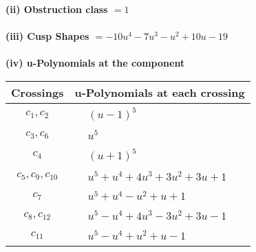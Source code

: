 \documentclass[1p]{elsarticle_modified}
\theoremstyle{definition}
\begin{document}
\flushleft \textbf{(ii) Obstruction class $= 1$}\\~\\
\flushleft \textbf{(iii) Cusp Shapes $= -10 u^4-7 u^3- u^2+10 u-19$}\\~\\
\newpage\renewcommand{\arraystretch}{1}
\flushleft \textbf{(iv) u-Polynomials at the component}\newline \\
\begin{tabular}{m{50pt}|m{274pt}}
Crossings & \hspace{64pt}u-Polynomials at each crossing \\
\hline $$\begin{aligned}c_{1},c_{2}\end{aligned}$$&$\begin{aligned}
&(u-1)^5
\end{aligned}$\\
\hline $$\begin{aligned}c_{3},c_{6}\end{aligned}$$&$\begin{aligned}
&u^5
\end{aligned}$\\
\hline $$\begin{aligned}c_{4}\end{aligned}$$&$\begin{aligned}
&(u+1)^5
\end{aligned}$\\
\hline $$\begin{aligned}c_{5},c_{9},c_{10}\end{aligned}$$&$\begin{aligned}
&u^5+u^4+4 u^3+3 u^2+3 u+1
\end{aligned}$\\
\hline $$\begin{aligned}c_{7}\end{aligned}$$&$\begin{aligned}
&u^5+u^4- u^2+u+1
\end{aligned}$\\
\hline $$\begin{aligned}c_{8},c_{12}\end{aligned}$$&$\begin{aligned}
&u^5- u^4+4 u^3-3 u^2+3 u-1
\end{aligned}$\\
\hline $$\begin{aligned}c_{11}\end{aligned}$$&$\begin{aligned}
&u^5- u^4+u^2+u-1
\end{aligned}$\\
\hline
\end{tabular}\\~\\
\end{document}
